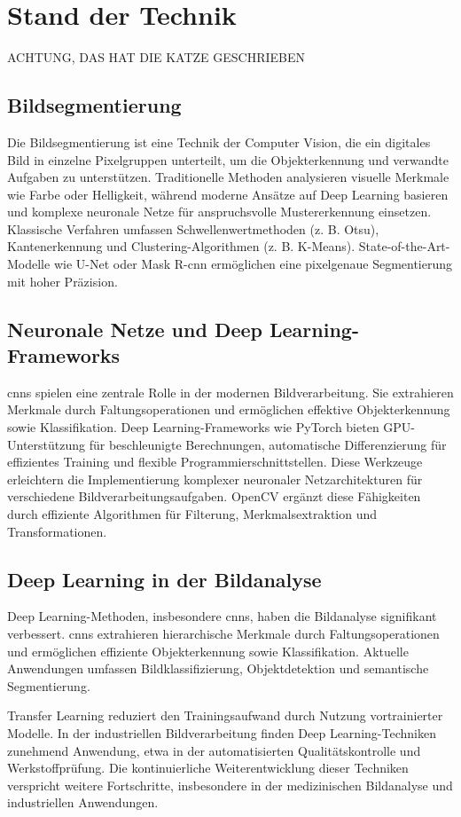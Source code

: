 \documentclass[journal,twoside,web]{ieeecolor}
\begin{document}
\section{Stand der Technik}
ACHTUNG, DAS HAT DIE KATZE GESCHRIEBEN
\subsection{Bildsegmentierung}  
Die Bildsegmentierung ist eine Technik der Computer Vision, die ein digitales Bild in einzelne Pixelgruppen unterteilt, um die Objekterkennung und verwandte Aufgaben zu unterstützen.  
Traditionelle Methoden analysieren visuelle Merkmale wie Farbe oder Helligkeit, während moderne Ansätze auf Deep Learning basieren und komplexe neuronale Netze für anspruchsvolle Mustererkennung einsetzen.  
Klassische Verfahren umfassen Schwellenwertmethoden (z. B. Otsu), Kantenerkennung und Clustering-Algorithmen (z. B. K-Means).  
State-of-the-Art-Modelle wie U-Net oder Mask R-\ac{cnn} ermöglichen eine pixelgenaue Segmentierung mit hoher Präzision.  

\subsection{Neuronale Netze und Deep Learning-Frameworks}  
\acp{cnn} spielen eine zentrale Rolle in der modernen Bildverarbeitung.
Sie extrahieren Merkmale durch Faltungsoperationen und ermöglichen effektive Objekterkennung sowie Klassifikation.
Deep Learning-Frameworks wie PyTorch bieten GPU-Unterstützung für beschleunigte Berechnungen, automatische Differenzierung für effizientes Training und flexible Programmierschnittstellen.
Diese Werkzeuge erleichtern die Implementierung komplexer neuronaler Netzarchitekturen für verschiedene Bildverarbeitungsaufgaben.
OpenCV ergänzt diese Fähigkeiten durch effiziente Algorithmen für Filterung, Merkmalsextraktion und Transformationen.

\subsection{Deep Learning in der Bildanalyse}  %
Deep Learning-Methoden, insbesondere \acp{cnn}, haben die Bildanalyse signifikant verbessert.
\acp{cnn} extrahieren hierarchische Merkmale durch Faltungsoperationen und ermöglichen effiziente Objekterkennung sowie Klassifikation.
Aktuelle Anwendungen umfassen Bildklassifizierung, Objektdetektion und semantische Segmentierung.

Transfer Learning reduziert den Trainingsaufwand durch Nutzung vortrainierter Modelle.
In der industriellen Bildverarbeitung finden Deep Learning-Techniken zunehmend Anwendung, etwa in der automatisierten Qualitätskontrolle und Werkstoffprüfung.
Die kontinuierliche Weiterentwicklung dieser Techniken verspricht weitere Fortschritte, insbesondere in der medizinischen Bildanalyse und industriellen Anwendungen.
\end{document}
